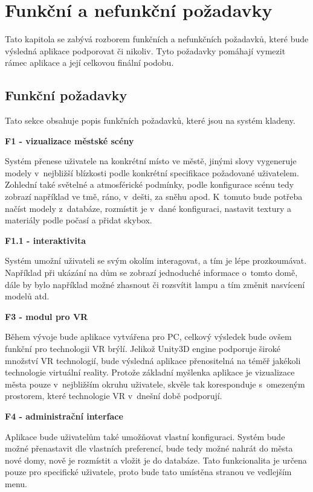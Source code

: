 \documentclass[thesis=B,czech]{FITthesis}[2012/06/26]
\begin{document}
		\section{Funkční a nefunkční požadavky}
	Tato kapitola se zabývá rozborem funkčních a nefunkčních požadavků, které bude výsledná aplikace podporovat či nikoliv. Tyto požadavky pomáhají vymezit rámec aplikace a její celkovou finální podobu.
	
	\subsection{Funkční požadavky}	
	Tato sekce obsahuje popis funkčních požadavků, které jsou na systém kladeny.
	
	\begin{description}
	
 		\item \textbf{F1 - vizualizace městské scény}
 		 			
 			Systém přenese uživatele na konkrétní místo ve městě, jinými slovy vygeneruje modely v~nejbližší blízkosti podle konkrétní specifikace požadované uživatelem. Zohlední také světelné a atmosférické podmínky, podle konfigurace scénu tedy zobrazí například ve tmě, ráno, v~dešti, za sněhu apod. K~tomuto bude potřeba načíst modely z~databáze, rozmístit je v~dané konfiguraci, nastavit textury a materiály podle počasí a přidat skybox.

 		\item \textbf{F1.1 - interaktivita}
 		
 		Systém umožní uživateli se svým okolím interagovat, a tím je lépe prozkoumávat. Například při ukázání na dům se zobrazí jednoduché informace o~tomto domě, dále by bylo například možné zhasnout či rozsvítit lampu a tím změnit nasvícení modelů atd.
 		
 		\item \textbf{F3 - modul pro VR}
 		
 		Během vývoje bude aplikace vytvářena pro PC, celkový výsledek bude ovšem funkční pro technologii VR brýlí. Jelikož Unity3D engine podporuje široké množství VR technologií, bude výsledná aplikace přenositelná na téměř jakékoli technologie virtuální reality. Protože základní myšlenka aplikace je vizualizace města pouze v~nejbližším okruhu uživatele, skvěle tak koresponduje s~omezeným prostorem, které technologie VR v~dnešní době podporují.
 		
 		\item \textbf{F4 - administrační interface}
 		
 		Aplikace bude uživatelům také umožňovat vlastní konfiguraci. Systém bude možné přenastavit dle vlastních preferencí, bude tedy možné nahrát do města nové domy, nově je rozmístit a vložit je do databáze. Tato funkcionalita je určena pouze pro specifické uživatele, proto bude tato umístěna stranou ve vedlejším menu.
 	\end{description}	
 		
\end{document}
